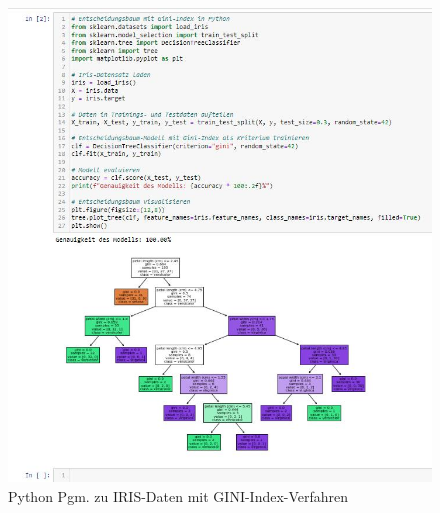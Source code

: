 \documentclass[12pt]{article}
\begin{document}
\begin{figure}[htp]
  \centering
  \hspace*{-0.9cm} 
  \includegraphics[width=1.12\textwidth]{Python-Bsp-Dec-GINI}
  \caption{Python Pgm. zu IRIS-Daten mit GINI-Index-Verfahren}     
  \label{fig:Pyt-Bsp-GINI}
\end{figure}
\\[13.2cm]
%
\end{document}
